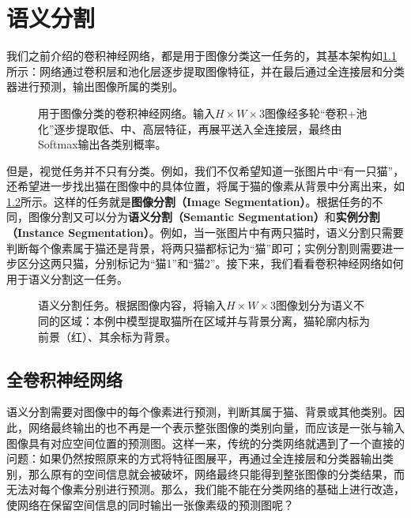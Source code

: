 
\chapter{语义分割}

我们之前介绍的卷积神经网络，都是用于图像分类这一任务的，其基本架构如\cref{fig:cnn_for_classification}所示：网络通过卷积层和池化层逐步提取图像特征，并在最后通过全连接层和分类器进行预测，输出图像所属的类别。

\begin{figure}[H]
    \caption{用于图像分类的卷积神经网络。输入$H\times W\times 3$图像经多轮“卷积+池化”逐步提取低、中、高层特征，再展平送入全连接层，最终由Softmax输出各类别概率。}
    \label{fig:cnn_for_classification}
\end{figure}

但是，视觉任务并不只有分类。例如，我们不仅希望知道一张图片中“有一只猫”，还希望进一步找出猫在图像中的具体位置，将属于猫的像素从背景中分离出来，如\cref{fig:segment}所示。这样的任务就是\textbf{图像分割（Image Segmentation）}。根据任务的不同，图像分割又可以分为\textbf{语义分割（Semantic Segmentation）}和\textbf{实例分割（Instance Segmentation）}。例如，当一张图片中有两只猫时，语义分割只需要判断每个像素属于猫还是背景，将两只猫都标记为“猫”即可；实例分割则需要进一步区分这两只猫，分别标记为“猫1”和“猫2”。接下来，我们看看卷积神经网络如何用于语义分割这一任务。

\begin{figure}[H]
    \caption{语义分割任务。根据图像内容，将输入$H\times W\times 3$图像划分为语义不同的区域：本例中模型提取猫所在区域并与背景分离，猫轮廓内标为前景（红）、其余标为背景。}
    \label{fig:segment}
\end{figure}

\section{全卷积神经网络}

语义分割需要对图像中的每个像素进行预测，判断其属于猫、背景或其他类别。因此，网络最终输出的也不再是一个表示整张图像的类别向量，而应该是一张与输入图像具有对应空间位置的预测图。这样一来，传统的分类网络就遇到了一个直接的问题：如果仍然按照原来的方式将特征图展平，再通过全连接层和分类器输出类别，那么原有的空间信息就会被破坏，网络最终只能得到整张图像的分类结果，而无法对每个像素分别进行预测。那么，我们能不能在分类网络的基础上进行改造，使网络在保留空间信息的同时输出一张像素级的预测图呢？

